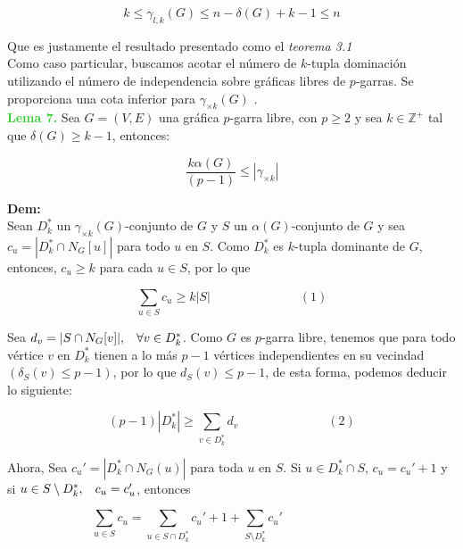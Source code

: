 \documentclass{article}
\begin{document}
$$k\leq \gamma_{l,k}(G)\leq n-\delta(G)+k-1\le n$$

Que es justamente el resultado presentado como el \textit{teorema 3.1}\\

Como caso particular, buscamos acotar el número de $k$-tupla dominación utilizando el número de independencia sobre gráficas libres de $p$-garras. Se proporciona una cota inferior para $\gamma_{\times k}(G)$ \cite{klasing2004hardness}.\\


\textcolor{LimeGreen}{\textbf{Lema 7.}} Sea $G=(V,E)$ una gráfica $p$-garra libre, con $p\geq 2$ y sea $k\in \mathbb{Z}^+$ tal que $\delta(G)\geq k-1$, entonces:

$$\frac{k\alpha(G)}{(p-1)}\leq |\gamma_{\times k}|$$

\textbf{Dem:}\\


Sean $D_{k}^*$ un $\gamma_{\times k}(G)$-conjunto de $G$ y $S$ un $\alpha(G)$-conjunto de $G$ y sea $c_{u}=|D_{k}^*\cap N_{G}[u]|$ para todo $u$ en $S$. Como $D_{k}^*$ es $k$-tupla dominante de $G$, entonces, $c_{u}\geq k$ para cada $u\in S$, por lo que

$$\sum_{u\in S}c_u\geq k|S| \hspace{3cm} (1)$$

Sea $d_v=|S\cap N_{G}[v]|, \hspace{.3 cm} \forall v\in D_{k}^*$. Como $G$ es $p$-garra libre, tenemos que para todo vértice $v$ en $D_{k}^*$  tienen a lo más $p-1$ vértices independientes en su vecindad $(\delta_{S}(v)\leq p-1)$, por lo que $d_S(v)\leq p-1$, de esta forma, podemos deducir lo siguiente:

$$(p-1)|D_{k}^*|\geq \sum_{v\in D_{k}^*}d_v \hspace{3cm} (2)$$

Ahora, Sea $c_{u}'=|D_{k}^* \cap N_{G}(u)|$ para toda $u$ en $S$. Si $u\in D_{k}^* \cap S$, $c_u=c_{u}'+1$ y si $u\in S \setminus D_{k}^*, \hspace{.3cm} c_u=c_{u}'$, entonces

$$\sum_{u\in S}c_u = \sum_{u\in S\cap D_{k}^*} c_u' + 1 + \sum_{S\setminus D_k^*} c_u' \hspace{3cm}$$
\end{document}
